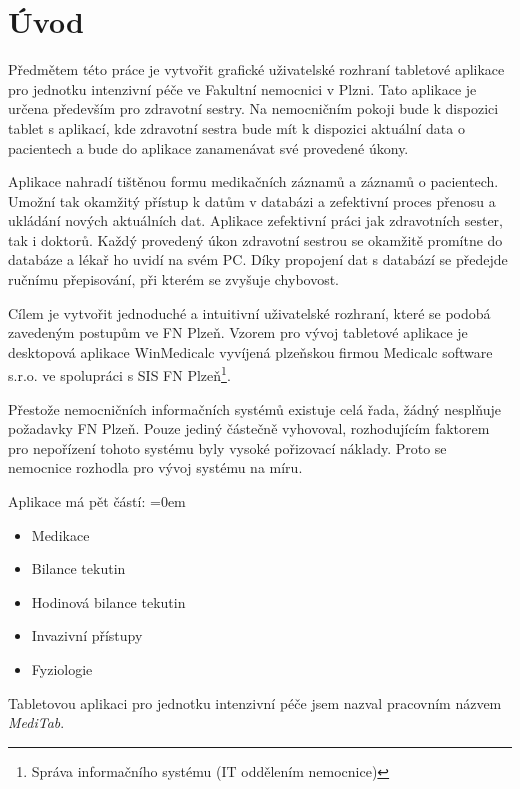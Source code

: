 \setlength{\parskip}{1em}

\chapter*{Úvod}

Předmětem této práce je vytvořit grafické uživatelské rozhraní tabletové aplikace pro jednotku intenzivní péče ve Fakultní nemocnici v Plzni. Tato aplikace je určena především pro zdravotní sestry. Na nemocničním pokoji bude k dispozici tablet s aplikací, kde zdravotní sestra bude mít k dispozici aktuální data o pacientech a bude do aplikace zanamenávat své provedené úkony.

Aplikace nahradí tištěnou formu medikačních záznamů a záznamů o pacientech. Umožní tak okamžitý přístup k datům v databázi a zefektivní proces přenosu a ukládání nových aktuálních dat. Aplikace zefektivní práci jak zdravotních sester, tak i doktorů. Každý provedený úkon zdravotní sestrou se okamžitě promítne do databáze a lékař ho uvidí na svém PC. Díky propojení dat s databází se předejde ručnímu přepisování, při kterém se zvyšuje chybovost.

Cílem je vytvořit jednoduché a intuitivní uživatelské rozhraní, které se podobá zavedeným postupům ve FN Plzeň. Vzorem pro vývoj tabletové aplikace je desktopová aplikace WinMedicalc vyvíjená plzeňskou firmou Medicalc software s.r.o. ve spolupráci s SIS FN Plzeň\footnote{Správa informačního systému (IT oddělením nemocnice)}.

Přestože nemocničních informačních systémů existuje celá řada, žádný nesplňuje požadavky FN Plzeň. Pouze jediný částečně vyhovoval, rozhodujícím faktorem pro nepořízení tohoto systému byly vysoké pořizovací náklady. Proto se nemocnice rozhodla pro vývoj systému na míru.

Aplikace má pět částí:
\parskip=0em
\begin{itemize}
	\item Medikace
	\item Bilance tekutin
	\item Hodinová bilance tekutin
	\item Invazivní přístupy
	\item Fyziologie
\end{itemize}

Tabletovou aplikaci pro jednotku intenzivní péče jsem nazval pracovním názvem \emph{MediTab}.